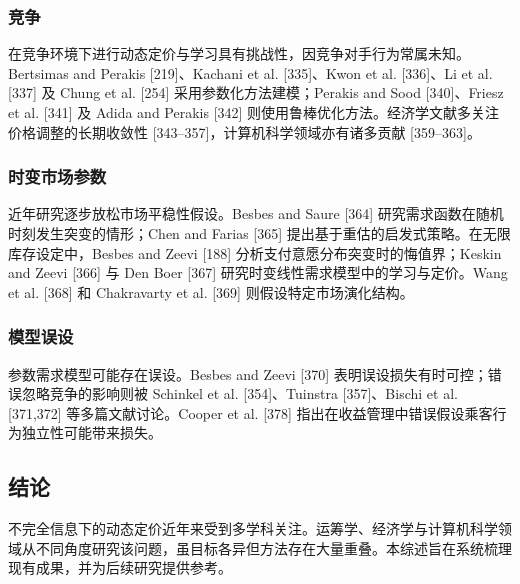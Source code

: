 \subsubsection{竞争}\label{competition}

在竞争环境下进行动态定价与学习具有挑战性，因竞争对手行为常属未知。Bertsimas and Perakis [219]、Kachani et al. [335]、Kwon et al. [336]、Li et al. [337] 及 Chung et al. [254] 采用参数化方法建模；Perakis and Sood [340]、Friesz et al. [341] 及 Adida and Perakis [342] 则使用鲁棒优化方法。经济学文献多关注价格调整的长期收敛性 [343–357]，计算机科学领域亦有诸多贡献 [359–363]。

\subsubsection{时变市场参数}\label{time-varying-market-parameters}

近年研究逐步放松市场平稳性假设。Besbes and Saure [364] 研究需求函数在随机时刻发生突变的情形；Chen and Farias [365] 提出基于重估的启发式策略。在无限库存设定中，Besbes and Zeevi [188] 分析支付意愿分布突变时的悔值界；Keskin and Zeevi [366] 与 Den Boer [367] 研究时变线性需求模型中的学习与定价。Wang et al. [368] 和 Chakravarty et al. [369] 则假设特定市场演化结构。

\subsubsection{模型误设}\label{model-misspecification}

参数需求模型可能存在误设。Besbes and Zeevi [370] 表明误设损失有时可控；错误忽略竞争的影响则被 Schinkel et al. [354]、Tuinstra [357]、Bischi et al. [371,372] 等多篇文献讨论。Cooper et al. [378] 指出在收益管理中错误假设乘客行为独立性可能带来损失。

\subsection{结论}\label{conclusion}

不完全信息下的动态定价近年来受到多学科关注。运筹学、经济学与计算机科学领域从不同角度研究该问题，虽目标各异但方法存在大量重叠。本综述旨在系统梳理现有成果，并为后续研究提供参考。
